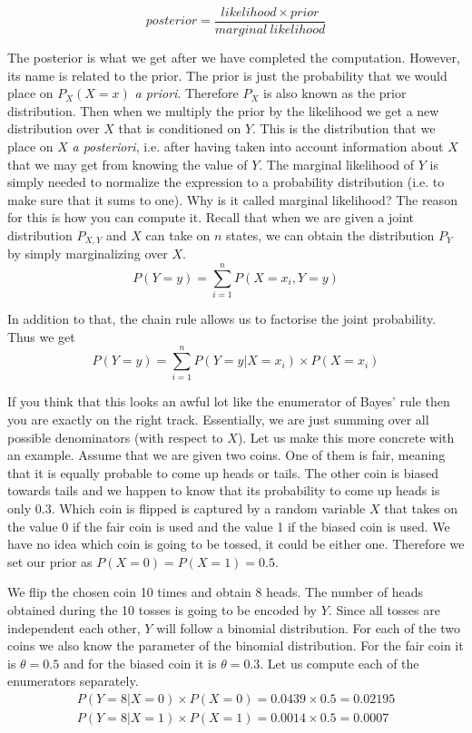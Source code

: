 $$ posterior = \dfrac{likelihood \times prior}{marginal~likelihood} $$

The posterior is what we get after we have completed the computation. However, its name is related to the prior.
The prior is just the probability that we would place on $ P_{X}(X=x) $ \textit{a priori}. Therefore $ P_{X} $
is also known as the prior distribution. Then when we multiply the prior by the likelihood we get a new distribution
over $ X $ that is conditioned on $ Y $. This is the distribution that we place on $ X $ \textit{a posteriori}, i.e.
after having taken into account information about $ X $ that we may get from knowing the value of $ Y $. The marginal
likelihood of $ Y $ is simply needed to normalize the expression to a probability distribution (i.e. to make sure that
it sums to one). Why is it called marginal likelihood? The reason for this is how you can compute it. Recall that when
we are given a joint distribution $ P_{X,Y} $ and $ X $ can take on $ n $ states, we can obtain the distribution
$ P_{Y} $ by simply marginalizing over $ X $.
\begin{equation}
P(Y=y) = \underset{i=1}{\overset{n}{\sum}}P(X=x_{i}, Y=y)
\end{equation}

In addition to that, the chain rule allows us to factorise the joint probability. Thus we get
\begin{equation}
P(Y=y) = \underset{i=1}{\overset{n}{\sum}}P(Y=y|X=x_{i}) \times P(X=x_{i})
\end{equation}

If you think that this looks an awful lot like the enumerator of Bayes' rule then you are exactly on the right track.
Essentially, we are just summing over all possible denominators (with respect to $ X $). Let us make this more
concrete with an example. Assume that we are given two coins. One of them is fair, meaning that it is equally probable
to come up heads or tails. The other coin is biased towards tails and we happen to know that its probability to come up
heads is only $ 0.3 $. Which coin is flipped is captured by a random variable $ X $ that takes on the value 0 if the
fair coin is used and the value 1 if the biased coin is used. We have no idea which coin is going to be tossed, it could
be either one. Therefore we set our prior as $ P(X=0) = P(X=1) = 0.5 $.

We flip the chosen coin 10 times and obtain 8 heads. The number of heads obtained during the 10 tosses is going
to be encoded by $ Y $. Since all tosses are independent each other, $ Y $ will
follow a binomial distribution. For each of the two coins we also know the parameter of the binomial distribution.
For the fair coin it is $ \theta = 0.5 $ and for the biased coin it is $ \theta = 0.3 $. Let us compute each of the
enumerators separately.
\begin{align}
P(Y=8|X=0) \times P(X=0) = 0.0439 \times 0.5 = 0.02195 \label{bayes1} \\ 
P(Y=8|X=1) \times P(X=1) = 0.0014 \times 0.5 = 0.0007 \label{bayes2}
\end{align}

